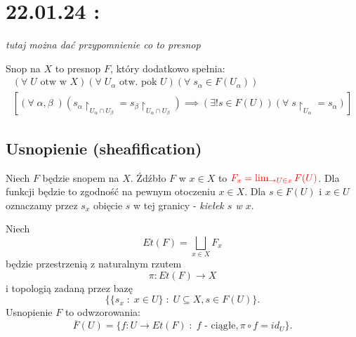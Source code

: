 \section{22.01.24 : }

\emph{\large\color{red}tutaj można dać przypomnienie co to presnop}

Snop na $X$ to presnop $F$, który dodatkowo spełnia:
\begin{align*}
  (\forall\;U\text{ otw w }X)(\forall\;U_\alpha\text{ otw. pok }U)(\forall\;s_\alpha\in F(U_\alpha))\\ 
  [(\forall\;\alpha,\beta\;)(s_\alpha\restriction_{U_\alpha\cap U_\beta}=s_\beta\restriction_{U_\alpha\cap U_\beta})\implies (\exists! s\in F(U))(\forall\;s\restriction_{U_\alpha}=s_\alpha)]
\end{align*}

\subsection{Usnopienie (sheafification)}
Niech $F$ będzie snopem na $X$. Źdźbło $F$ w $x\in X$ to $\color{red}F_x=\lim_{\to U\in x}F(U)$. Dla funkcji będzie to zgodność na pewnym otoczeniu $x\in X$. Dla $s\in F(U)$ i $x\in U$ oznaczamy przez $s_x$ obięcie $s$ w tej granicy - \emph{kiełek $s$ w $x$}.

Niech 
$$Et(F)=\bigsqcup_{x\in X} F_x$$ 
będzie przestrzenią z naturalnym rzutem 
$$\pi:Et(F)\to X$$ 
i topologią zadaną przez bazę 
$$\{\{s_x\;:\;x\in U\}\;:\;U\subseteq X, s\in F(U)\}.$$
Usnopienie $F$ to odwzorowania:
$$\overline{F}(U)=\{f:U\to Et(F)\;:\;f\text{ - ciągłe}, \pi\circ f=id_U\}.$$

\begin{center}
\end{center}

